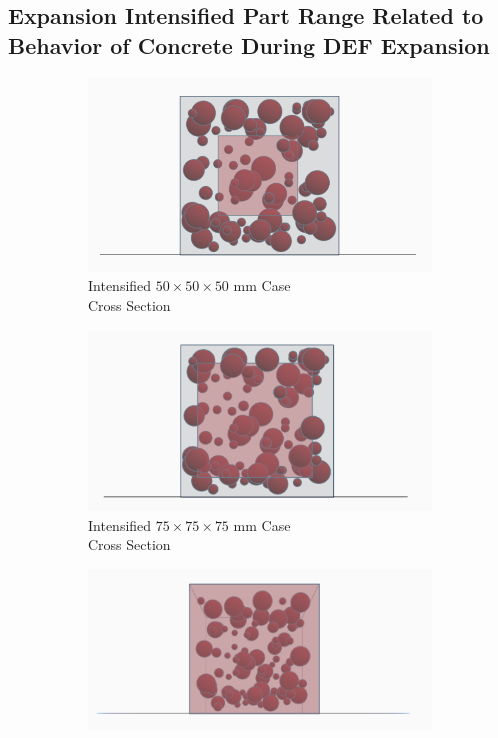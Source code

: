 \clearpage
\subsection{Expansion Intensified Part Range Related to Behavior of Concrete During DEF Expansion}




\begin{figure}[!ht]
\centering
    \begin{subfigure}{.33\textwidth}
      \centering
      \includegraphics[width=.8\linewidth]{Files/DEF_X/X0_3ds.png}
      \caption{Intensified $50 \times 50 \times 50$ mm Case\\ Cross Section}
    \end{subfigure}%
    \begin{subfigure}{.33\textwidth}
      \centering
      \includegraphics[width=.8\linewidth]{Files/DEF_X/X-5_3ds.png}
      \caption{Intensified $75 \times 75 \times 75$ mm Case \\ Cross Section}
    \end{subfigure}%
    \begin{subfigure}{.33\textwidth}
      \centering
      \includegraphics[width=.9\linewidth]{Files/DEF_X/X-1_3ds.png}

\end{subfigure}
\end{figure}

